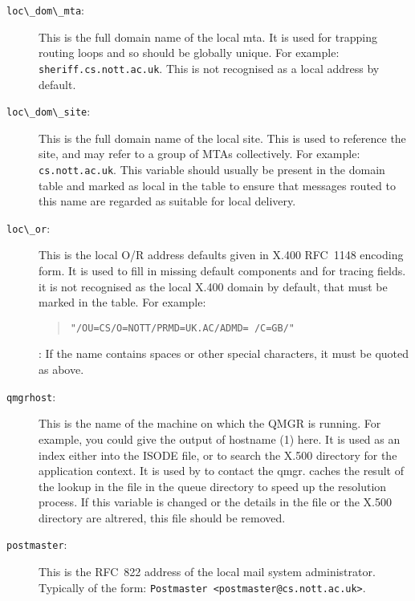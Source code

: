 \begin{description}
\item[\verb+loc\_dom\_mta+:]
This is the full domain name of the local mta. 
It is used for trapping routing loops and so should be globally unique.
For example: \linebreak \verb+sheriff.cs.nott.ac.uk+. This is not
recognised as a local address by default.

\item[\verb+loc\_dom\_site+:]
This is the full domain name of the local site. This is used to reference the
site, and may refer to a group of MTAs collectively. For example:
\verb+cs.nott.ac.uk+. This variable should usually be present in the
domain table and marked as local in the  table to ensure
that messages routed to this name are regarded as suitable for local
delivery.

\item[\verb+loc\_or+:]
This is the local O/R address defaults given in X.400 RFC~1148
encoding form. It is used to fill in missing default components and
for tracing fields. it is not recognised as the local X.400 domain by
default, that must be marked in the  table.
For example:
\begin{quote}\begin{verbatim}
"/OU=CS/O=NOTT/PRMD=UK.AC/ADMD= /C=GB/"
\end{verbatim}\end{quote}
: If the name contains spaces or other special characters, it must
be quoted as above.

\item[\verb+qmgrhost+:]
This is the name of the machine on which the QMGR is running. For
example, you could give the output of \man hostname (1) here. It is
used as an index either into the ISODE  file, or to
search the X.500 directory for the application context. It is used by
 to contact the qmgr.  caches the result of
the lookup in the file  in the queue directory to
speed up the resolution process. If this variable is changed or the
details in the  file or the X.500 directory are
altrered, this file should be removed.

\item[\verb+postmaster+:]
This is the RFC~822 address of the local mail system administrator.
Typically of the form: \verb+Postmaster <postmaster@cs.nott.ac.uk>+.



\end{description}
